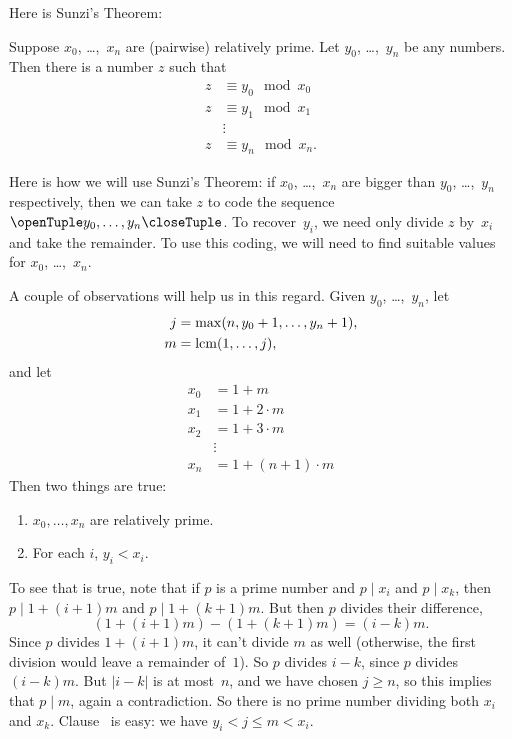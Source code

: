 \documentclass[../../../include/open-logic-section]{subfiles}
\begin{document}
Here is Sunzi's Theorem:
\begin{thm}
Suppose $x_0$, \dots,~$x_n$ are (pairwise) relatively prime. Let
$y_0$, \dots,~$y_n$ be any numbers. Then there is a number $z$ such that
\begin{align*}
z & \equiv y_0 \mod x_0 \\
z & \equiv y_1 \mod x_1 \\
& \vdots  \\
z & \equiv y_n \mod x_n.
\end{align*}
\end{thm}

Here is how we will use Sunzi's Theorem: if $x_0$,
\dots,~$x_n$ are bigger than $y_0$, \dots,~$y_n$ respectively, then we
can take $z$ to code the sequence $\tuple{y_0, \dots,y_n}$. To
recover~$y_i$, we need only divide $z$ by~$x_i$ and take the
remainder. To use this coding, we will need to find suitable values
for $x_0$, \dots,~$x_n$.

A couple of observations will help us in this regard. Given
$y_0$, \dots,~$y_n$, let
\begin{align*}
j &= \max(n, y_0 + 1, \dots, y_n + 1), \\
m &= \operatorname{lcm}(1,\dots,j),
\end{align*}
and let
\begin{align*}
x_0 & = 1 + m \\
x_1 & = 1 + 2 \cdot m \\
x_2 & = 1 + 3 \cdot m \\
& \vdots  \\
x_n & = 1 + (n+1) \cdot m
\end{align*}
Then two things are true:
\begin{enumerate}
\item{} $x_0,\dots,x_n$ are relatively prime.
\item{} For each $i$, $y_i < x_i$.
\end{enumerate}
To see that  is true, note that if $p$ is a prime number
and $p \mid x_i$ and $p \mid x_k$, then $p \mid 1 + (i+1) m$ and
$p \mid 1 + (k+1) m$. But then $p$ divides their difference,
\[
(1 + (i+1)m) - (1+ (k+1)m) = (i-k) m.
\]
Since $p$ divides $1 + (i+1)m$, it can't divide $m$ as well
(otherwise, the first division would leave a remainder of~$1$). So $p$
divides $i-k$, since $p$ divides $(i-k)m$. But $\left|i-k\right|$ is at
most~$n$, and we have chosen $j \geq n$, so this implies that
$p \mid m$, again a contradiction. So there is no prime number dividing
both $x_i$ and $x_k$. Clause~ is easy:
we have $y_i < j \leq m < x_i$.
\end{document}
